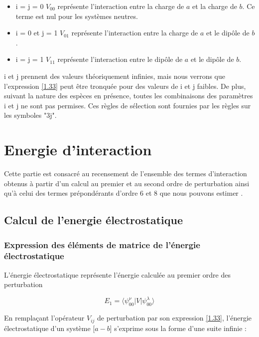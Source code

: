 	\begin{itemize}
		\item i = j = 0 $V_{00}$ représente l'interaction entre la charge de $a$ et la charge de $b$. Ce terme est nul pour les systèmes neutres. 
		
		\item i = 0 et j = 1 $V_{01}$ représente l'interaction entre la charge de $a$ et le dipôle de $b$. 
		
		\item i = j = 1  $V_{11}$ représente l'interaction entre le dipôle de $a$ et le dipôle de $b$.
	\end{itemize}
	
	i et j prennent des valeurs théoriquement infinies, mais nous verrons que l'expression \ref{1.33} peut être tronquée pour des valeurs de i et j faibles. De plus, suivant la nature des espèces en présence, toutes les combinaisons des paramètres i et j ne sont pas permises. Ces règles de sélection sont fournies par les règles sur les symboles "3j".
	
	
	\chapter*{Energie d'interaction}
	
	Cette partie est consacré au recensement de l'ensemble des termes d'interaction obtenus à partir d'un calcul au premier et au second ordre de perturbation ainsi qu'à celui des termes prépondérants d'ordre 6 et 8 que nous pouvons estimer \cite{saute1982calculated}.
	
	\section{Calcul de l'energie électrostatique}	
	
	\subsection{Expression des éléments de matrice de l'énergie électrostatique}
	
	L'énergie électrostatique représente l'énergie calculée au premier ordre des perturbation 
	
	\begin{equation}
	E_{1} = \langle \psi_{00}^{\nu}|V| \psi_{00}^{\lambda}\rangle
	\end{equation}
	
	
	En remplaçant l'opérateur $V_{ij}$ de perturbation par son expression \ref{1.33}, l'énergie électrostatique d'un système [$a-b$] s'exprime sous la forme d'une suite infinie : 
	
